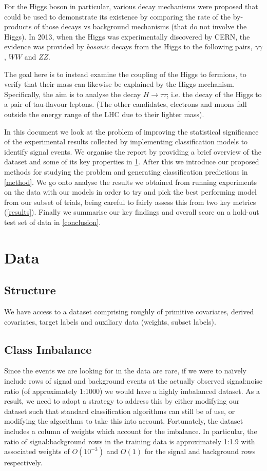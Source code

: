 For the Higgs boson in particular, various decay mechanisms were proposed that could be used to demonstrate its existence by comparing the rate of the by-products of those decays vs background mechanisms (that do not involve the Higgs). In 2013, when the Higgs was experimentally discovered by CERN, the evidence was provided by \emph{bosonic} decays from the Higgs to the following pairs, $\gamma\gamma$, $WW$ and $ZZ$. 

The goal here is to instead examine the coupling of the Higgs to fermions, to verify that their mass can likewise be explained by the Higgs mechanism. Specifically, the aim is to analyse the decay $H\rightarrow\tau\tau$; i.e. the decay of the Higgs to a pair of tau-flavour leptons. (The other candidates, electrons and muons fall outside the energy range of the LHC due to their lighter mass).

In this document we look at the problem of improving the statistical significance of the experimental results collected by implementing classification models to identify signal events. We organise the report by providing a brief overview of the dataset and some of its key properties in \ref{data}. After this we introduce our proposed methods for studying the problem and generating classification predictions in \ref{method}. We go onto analyse the results we obtained from running experiments on the data with our models in order to try and pick the best performing model from our subset of trials, being careful to fairly assess this from two key metrics (\ref{results}). Finally we summarise our key findings and overall score on a hold-out test set of data in \ref{conclusion}.

\section{Data}
\label{data}
\subsection{Structure}
We have access to a dataset comprising roughly of primitive covariates, derived covariates, target labels and auxiliary data (weights, subset labels). 

\subsection{Class Imbalance}
Since the events we are looking for in the data are rare, if we were to na\"{\i}vely include rows of signal and background events at the actually observed signal:noise ratio (of approximately 1:1000) we would have a highly imbalanced dataset. As a result, we need to adopt a strategy to address this by either modifying our dataset such that standard classification algorithms can still be of use, or modifying the algorithms to take this into account. Fortunately, the dataset includes a column of weights which account for the imbalance. In particular, the ratio of signal:background rows in the training data is approximately 1:1.9 with associated weights of $O(10^{-3})$ and $O(1)$ for the signal and background rows respectively.

